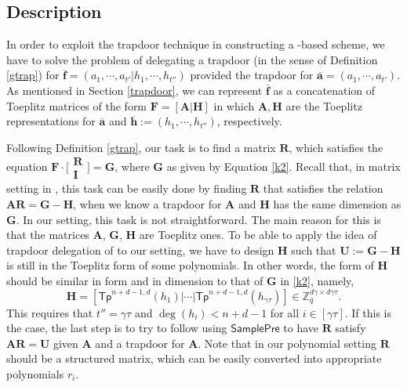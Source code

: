 \documentclass[runningheads]{llncs}
\begin{document}
\subsection{Description}
   In order to exploit the trapdoor technique in constructing a -based  scheme, we have to solve the problem of delegating a trapdoor (in the sense of Definition \ref{gtrap}) for $\overline{\mathbf{f}}=(a_1,\cdots, a_{t'}|h_1, \cdots, h_{t''} )$ provided the trapdoor for $\overline{\mathbf{a}}=(a_1,\cdots, a_{t'})$. %
    As mentioned in Section \ref{trapdoor}, we can represent $\overline{\mathbf{f}}$ as a concatenation of Toeplitz matrices of the form $\mathbf{F}=[\mathbf{A}|\mathbf{H}]$ in which $\mathbf{A}, \mathbf{H}$ are the Toeplitz representations for $\overline{\mathbf{a}}$ and $\overline{\mathbf{h}}:=(h_1, \cdots, h_{t''})$, respectively. 
    
Following Definition \ref{gtrap}, our task is to find a matrix $\mathbf{R}$,
 which satisfies the equation 
    $\mathbf{F}\cdot \bigl[ \begin{smallmatrix}
       \mathbf{R}\\ \mathbf{I}
     \end{smallmatrix} \bigr]=\mathbf{G}$,
where $\mathbf{G}$ as given by Equation \eqref{k2}. 
Recall that, in matrix setting in \cite[Section 5.5]{MP12}, this task can be easily done by finding $\mathbf{R}$ that satisfies the relation $ \mathbf{A}\mathbf{R}=\mathbf{G}-\mathbf{H}$, 
when we know a trapdoor for $\mathbf{A}$ and 
 $\textbf{H}$ has the same dimension as $\textbf{G}$. 
In our setting, this task is not straightforward. 
The main reason for this is that the matrices $\textbf{A}$, $\textbf{G}$, $\textbf{H}$ 
are Toeplitz ones. 
To be able to  apply the idea of trapdoor delegation of \cite{MP12} to our setting, 
we have to design $\mathbf{H}$ such that $\mathbf{U}:=\mathbf{G}-\mathbf{H}$ is still in the Toeplitz form of some polynomials. 
In other words, the form of $\mathbf{H}$ should be similar in form and in dimension to that of $\mathbf{G}$ in \eqref{k2}, namely,
      	\begin{equation}\label{k8}
      	\mathbf{H}=[\mathsf{Tp}^{n+d-1,d}(h_1)|\cdots|\mathsf{Tp}^{n+d-1,d}(h_{\gamma \tau})] \in \mathbb{Z}_q^{d\gamma \times d\gamma \tau}. 
      	\end{equation}
This requires that $t''=\gamma \tau$ and $\deg(h_i)<n+d-1$ for all $i\in [\gamma \tau]$. 
If this is the case, the last step is to try to follow \cite{LVV19} using $\mathsf{SamplePre}$ 
to have  $\mathbf{R}$ satisfy $\mathbf{A}\mathbf{R}=\mathbf{U}$ given $\mathbf{A}$ 
and a trapdoor for $\mathbf{A}$. 
Note that in our polynomial setting $\textbf{R}$ should  be a structured matrix, which can be easily converted into appropriate polynomials $r_i$. 
    
\end{document}
